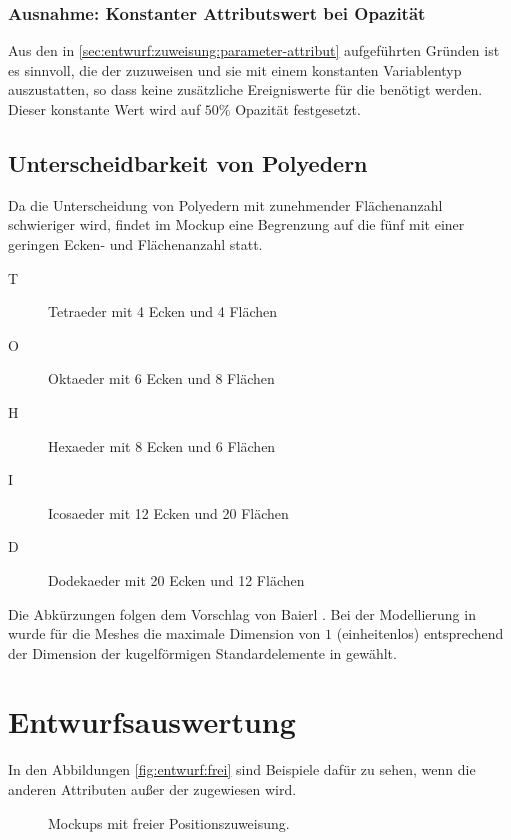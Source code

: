 \subsubsection{Ausnahme: Konstanter Attributswert bei Opazität}

Aus den in \autoref{sec:entwurf:zuweisung:parameter-attribut} aufgeführten Gründen ist es sinnvoll, die  der  zuzuweisen und sie mit einem konstanten Variablentyp auszustatten, so dass keine zusätzliche Ereigniswerte für die  benötigt werden. Dieser konstante Wert wird auf $50\%$ Opazität festgesetzt.

\subsection{Unterscheidbarkeit von Polyedern}

Da die Unterscheidung von Polyedern mit zunehmender Flächenanzahl schwieriger wird, findet im Mockup eine Begrenzung auf die fünf  mit einer geringen Ecken- und Flächenanzahl statt.
\begin{description}
	\item[T] Tetraeder mit 4 Ecken und 4 Flächen
	\item[O] Oktaeder mit 6 Ecken und 8 Flächen
	\item[H] Hexaeder mit 8 Ecken und 6 Flächen
	\item[I] Icosaeder mit 12 Ecken und 20 Flächen
	\item[D] Dodekaeder mit 20 Ecken und 12 Flächen
\end{description}
Die Abkürzungen folgen dem Vorschlag von Baierl \cite[S.~42]{KonvexePolyeder}. Bei der Modellierung in  wurde für die Meshes die maximale Dimension von $1$ (einheitenlos) entsprechend der Dimension der kugelförmigen Standardelemente in  gewählt.


\section{Entwurfsauswertung}

In den Abbildungen \autoref{fig:entwurf:frei} sind Beispiele dafür zu sehen, wenn die  anderen Attributen außer der  zugewiesen wird.

\begin{figure}
	\caption{Mockups mit freier Positionszuweisung.}\label{fig:entwurf:frei}
\end{figure}

